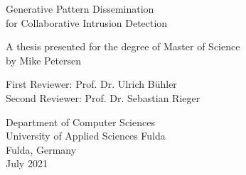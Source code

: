 \documentclass[../main.tex]{subfiles}
\begin{document}
    
\newcommand\BackgroundPic{%
\put(0,-170){%
\parbox[b][\paperheight]{\paperwidth}{%
\vfill
\centering
{\transparent{0.05} }%
\vfill
}}}


\begin{titlepage}
    \begin{center}
        \vspace*{1cm}
            
        \Huge
        Generative Pattern Dissemination \\
        for Collaborative Intrusion Detection
            
        \vspace{0.5cm}
        \large
            
        \vspace{3cm}
            
            
        \normalsize
        A thesis presented for the degree of Master of Science \\
        by Mike Petersen
        
        \vspace{1.5cm}
        
        First Reviewer: Prof. Dr. Ulrich Bühler \\
        Second Reviewer: Prof. Dr. Sebastian Rieger
            
        \vfill
            
        \normalsize
        Department of Computer Sciences\\
        University of Applied Sciences Fulda\\
        Fulda, Germany\\
        July 2021
            
    \end{center}
\end{titlepage}
\end{document}
